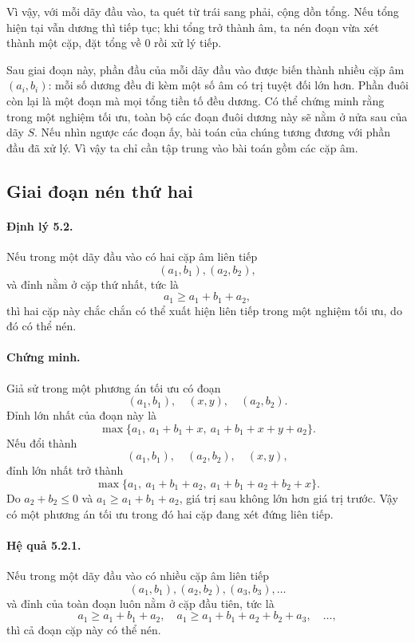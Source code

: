 \documentclass[11pt]{article}
\begin{document}
Vì vậy, với mỗi dãy đầu vào, ta quét từ trái sang phải, cộng dồn tổng. Nếu
tổng hiện tại vẫn dương thì tiếp tục; khi tổng trở thành âm, ta nén đoạn vừa
xét thành một cặp, đặt tổng về $0$ rồi xử lý tiếp.

Sau giai đoạn này, phần đầu của mỗi dãy đầu vào được biến thành nhiều cặp âm
$(a_i,b_i)$: mỗi số dương đều đi kèm một số âm có trị tuyệt đối lớn hơn.
Phần đuôi còn lại là một đoạn mà mọi tổng tiền tố đều dương. Có thể chứng minh
rằng trong một nghiệm tối ưu, toàn bộ các đoạn đuôi dương này sẽ nằm ở nửa sau
của dãy $S$. Nếu nhìn ngược các đoạn ấy, bài toán của chúng tương đương với
phần đầu đã xử lý. Vì vậy ta chỉ cần tập trung vào bài toán gồm các cặp âm.

\subsection{Giai đoạn nén thứ hai}

\paragraph{Định lý 5.2.}
Nếu trong một dãy đầu vào có hai cặp âm liên tiếp
\[
  (a_1,b_1),(a_2,b_2),
\]
và đỉnh nằm ở cặp thứ nhất, tức là
\[
  a_1\ge a_1+b_1+a_2,
\]
thì hai cặp này chắc chắn có thể xuất hiện liên tiếp trong một nghiệm tối ưu,
do đó có thể nén.

\paragraph{Chứng minh.}
Giả sử trong một phương án tối ưu có đoạn
\[
  (a_1,b_1),\quad (x,y),\quad (a_2,b_2).
\]
Đỉnh lớn nhất của đoạn này là
\[
  \max\{a_1,\ a_1+b_1+x,\ a_1+b_1+x+y+a_2\}.
\]
Nếu đổi thành
\[
  (a_1,b_1),\quad (a_2,b_2),\quad (x,y),
\]
đỉnh lớn nhất trở thành
\[
  \max\{a_1,\ a_1+b_1+a_2,\ a_1+b_1+a_2+b_2+x\}.
\]
Do $a_2+b_2\le 0$ và $a_1\ge a_1+b_1+a_2$, giá trị sau không lớn hơn giá trị
trước. Vậy có một phương án tối ưu trong đó hai cặp đang xét đứng liên tiếp.

\paragraph{Hệ quả 5.2.1.}
Nếu trong một dãy đầu vào có nhiều cặp âm liên tiếp
\[
  (a_1,b_1),(a_2,b_2),(a_3,b_3),\ldots
\]
và đỉnh của toàn đoạn luôn nằm ở cặp đầu tiên, tức là
\[
  a_1\ge a_1+b_1+a_2,\quad
  a_1\ge a_1+b_1+a_2+b_2+a_3,\quad \ldots,
\]
thì cả đoạn cặp này có thể nén.
\end{document}
